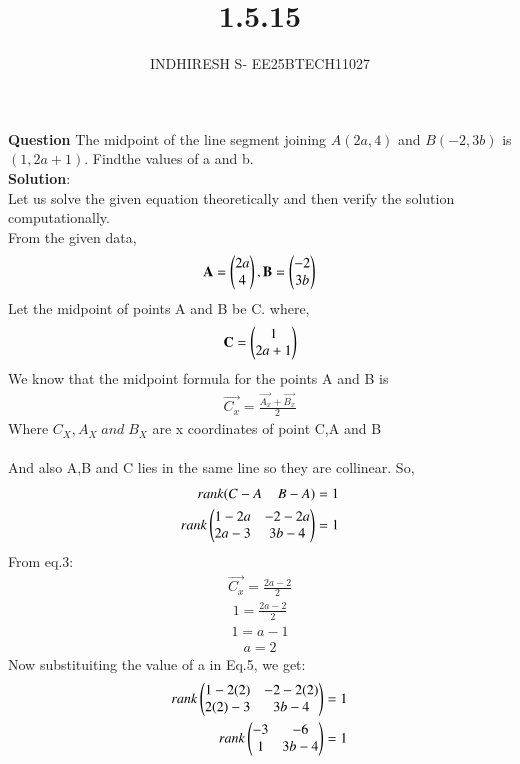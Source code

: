 \documentclass[journal]{IEEEtran}
\theoremstyle{remark}
\begin{document}

\onecolumn

\title{1.5.15}
\author{INDHIRESH S- EE25BTECH11027}
\maketitle


\renewcommand{\thefigure}{\theenumi}
\renewcommand{\thetable}{\theenumi}

\textbf{Question} The midpoint of the line segment joining $A(2a, 4)$ and $B(-2, 3b)$ is $(1, 2a + 1)$. Findthe values of a and b.\\
\textbf{Solution}:\\
Let us solve the given equation theoretically and then verify the solution computationally. \\
From the given data,
\begin{align}
\mathbf{A}= \begin{pmatrix}2a\\4\end{pmatrix} , \mathbf{B}=\begin{pmatrix}-2\\3b\end{pmatrix}
\end{align}
Let the midpoint of points A and B be C. where,
\begin{align}
    \mathbf{C}=\begin{pmatrix}1\\2a+1\end{pmatrix}
\end{align}
We know that the midpoint formula for the points A and B is
\begin{align}
    \vec{C_x}=\frac{\vec{A_x}+\vec{B_x}}{2}
\end{align}
Where $C_X,A_X\;and\;B_X$ are x coordinates of point C,A and B \\\\
And also A,B and C lies in the same line so they are collinear. So,
\begin{align}
   rank(C-A\;\;\;\;B-A )=1\\
   rank\begin{pmatrix}1-2a&-2-2a\\
   2a-3&3b-4\end{pmatrix}=1
\end{align}
From eq.3:
\begin{align}
    \vec{C_x}=\frac{2a-2}{2}
\end{align}
\begin{align}
    1=\frac{2a-2}{2}
\end{align}
\begin{align}
    1=a-1
\end{align}
\begin{align}
    a=2
\end{align}
Now substituiting the value of a in Eq.5, we get:
\begin{align}
     rank\begin{pmatrix}1-2(2)&-2-2(2)\\
   2(2)-3&3b-4\end{pmatrix}=1\\
    rank\begin{pmatrix}-3&-6\\
   1&3b-4\end{pmatrix}=1
\end{align}
\end{document}
